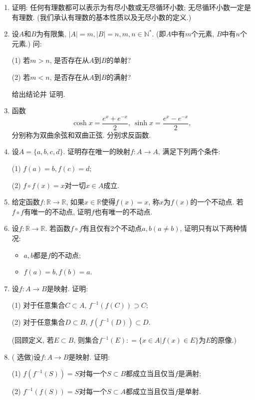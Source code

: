 \documentclass[UTF8,11pt, a4paper, oneside, fontset=none]{ctexbook}
\begin{document}
\begin{enumerate}
\begin{itemize}
\begin{align*}
\left(\sum\limits_{k=1}^n a_k^2 \right) \left( \sum\limits_{k=1}^n b_k^2\right) - \left( \sum\limits_{k=1}^n a_k b_k \right)^2 &= \frac{1}{2} \sum\limits_{k=1}^n \sum\limits_{i=1}^n (a_kb_i - a_ib_k)^2 \\
&=  \sum\limits_{k=1}^{n-1} \sum\limits_{i=k+1}^n (a_kb_i - a_ib_k)^2;
\end{align*}
tip: 先交换指标证明后两项相等.

\end{itemize}

\item 证明: 任何有理数都可以表示为有尽小数或无尽循环小数; 无尽循环小数一定是有理数. (我们承认有理数的基本性质以及无尽小数的定义.)

\item 设$A$和$B$为有限集, $|A| =m, |B| =n, m, n \in \mathbb N^*$. (即$A$中有$m$个元素, $B$中有$n$个元素.) 问: 

(1) 若$m>n$, 是否存在从$A$到$B$的单射?

(2) 若$m < n$, 是否存在从$A$到$B$的满射?

给出结论并{\color{red} 证明}. 

\item 函数
\[
\cosh x = \frac{e^x + e^{-x}}{2}, \ \sinh x = \frac{e^x - e^{-x}}{2},
\]
分别称为双曲余弦和双曲正弦. 分别求反函数.

\item 设$A = \{ a, b, c, d\}$. 证明存在唯一的映射$f : A \to A$, 满足下列两个条件:

(1) $f(a) = b, f(c) = d$;

(2) $f \circ f(x) = x$对一切$x \in A$成立.

\item 给定函数$f : \mathbb R \to \mathbb R$, 如果$x \in \mathbb R$使得$f(x) =x$, 称$x$为$f(x)$的一个不动点. 若$f \circ f$有唯一的不动点, 证明$f$也有唯一的不动点.

\item 设$f : \mathbb R \to \mathbb R$. 若函数$f\circ f$有且仅有2个不动点$a, b (a \neq b)$, 证明只有以下两种情况:
\begin{itemize}
\item[(1)] $a, b$都是$f$的不动点;
\item[(2)] $f(a)=b, f(b) =a$.
\end{itemize}

\item 设$f : A \to B$是映射. 证明:

(1) 对于任意集合$C \subset A$, $f^{-1} (f(C)) \supset C$;

(2) 对于任意集合$D \subset B$, $f(f^{-1} (D)) \subset D$.

(回顾定义, 若$E \subset B$, 则集合$f^{-1}(E) : = \{ x \in A | f(x) \in E \}$为$E$的原像.)

\item ({\color{red} 选做})设$f : A \to B$是映射. 证明:

(1) $f(f^{-1}(S)) = S$对每一个$S \subset B$都成立当且仅当$f$是满射;

(2) $f^{-1}(f(S)) = S$对每一个$S \subset A$都成立当且仅当$f$是单射.

\end{enumerate}
\clearpage
\end{document}
